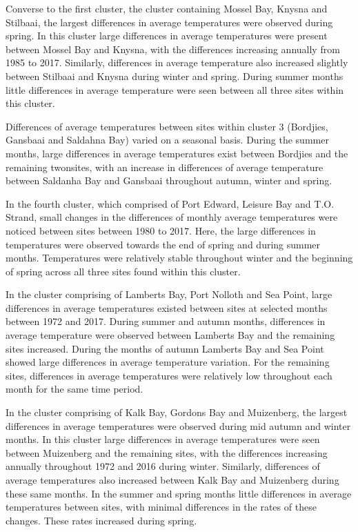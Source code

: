 \documentclass[12pt,A4paper,]{article}
\begin{document}
Converse to the first cluster, the cluster containing Mossel Bay, Knysna
and Stilbaai, the largest differences in average temperatures were
observed during spring. In this cluster large differences in average
temperatures were present between Mossel Bay and Knysna, with the
differences increasing annually from 1985 to 2017. Similarly,
differences in average temperature also increased slightly between
Stilbaai and Knysna during winter and spring. During summer months
little differences in average temperature were seen between all three
sites within this cluster.

Differences of average temperatures between sites within cluster 3
(Bordjies, Gansbaai and Saldahna Bay) varied on a seasonal basis. During
the summer months, large differences in average temperatures exist
between Bordjies and the remaining twonsites, with an increase in
differences of average temperature between Saldanha Bay and Gansbaai
throughout autumn, winter and spring.

In the fourth cluster, which comprised of Port Edward, Leisure Bay and
T.O. Strand, small changes in the differences of monthly average
temperatures were noticed between sites between 1980 to 2017. Here, the
large differences in temperatures were observed towards the end of
spring and during summer months. Temperatures were relatively stable
throughout winter and the beginning of spring across all three sites
found within this cluster.

In the cluster comprising of Lamberts Bay, Port Nolloth and Sea Point,
large differences in average temperatures existed between sites at
selected months between 1972 and 2017. During summer and autumn months,
differences in average temperature were observed between Lamberts Bay
and the remaining sites increased. During the months of autumn Lamberts
Bay and Sea Point showed large differences in average temperature
variation. For the remaining sites, differences in average temperatures
were relatively low throughout each month for the same time period.

In the cluster comprising of Kalk Bay, Gordons Bay and Muizenberg, the
largest differences in average temperatures were observed during mid
autumn and winter months. In this cluster large differences in average
temperatures were seen between Muizenberg and the remaining sites, with
the differences increasing annually throughout 1972 and 2016 during
winter. Similarly, differences of average temperatures also increased
between Kalk Bay and Muizenberg during these same months. In the summer
and spring months little differences in average temperatures between
sites, with minimal differences in the rates of these changes. These
rates increased during spring.
\end{document}
